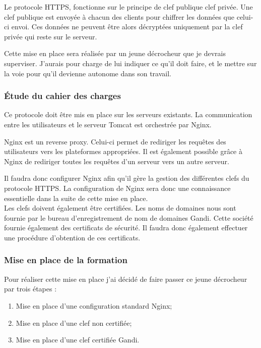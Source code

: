 Le protocole HTTPS, fonctionne sur le principe de clef publique clef privée. Une clef publique est envoyée à chacun des clients pour chiffrer les données que celui-ci envoi. Ces données ne peuvent être alors décryptées uniquement par la clef privée qui reste sur le serveur.

Cette mise en place sera réalisée par un jeune décrocheur que je devrais superviser. J'aurais pour charge de lui indiquer ce qu'il doit faire, et le mettre sur la voie pour qu'il devienne autonome dans son travail.

\subsubsection{Étude du cahier des charges}

Ce protocole doit être mis en place sur les serveurs existants. La communication entre les utilisateurs et le serveur Tomcat est orchestrée par Nginx.

Nginx est un reverse proxy. Celui-ci permet de rediriger les requêtes des utilisateurs vers les plateformes appropriées. Il est également possible grâce à Nginx de rediriger toutes les requêtes d'un serveur vers un autre serveur.

Il faudra donc configurer Nginx afin qu'il gère la gestion des différentes clefs du protocole HTTPS. La configuration de Nginx sera donc une connaissance essentielle dans la suite de cette mise en place.\\

Les clefs doivent également être certifiées. Les noms de domaines nous sont fournie par le bureau d'enregistrement de nom de domaines Gandi. Cette société fournie également des certificats de sécurité. Il faudra donc également effectuer une procédure d'obtention de ces certificats.

\subsubsection{Mise en place de la formation}

Pour réaliser cette mise en place j'ai décidé de faire passer ce jeune décrocheur par trois étapes :

\begin{enumerate}
	\item Mise en place d'une configuration standard Nginx;
	\item Mise en place d'une clef non certifiée;
	\item Mise en place d'une clef certifiée Gandi.
\end{enumerate}

